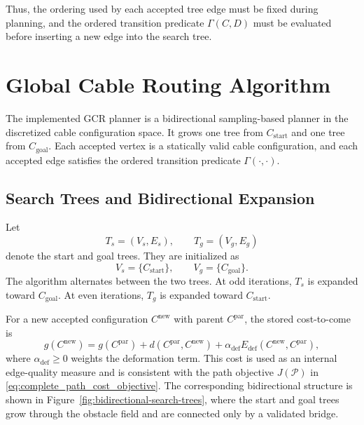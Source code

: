 \documentclass{pas}
\begin{document}
Thus, the ordering used by each accepted tree edge must be fixed
during planning, and the ordered transition predicate $\Gamma(C,D)$
must be evaluated before inserting a new edge into the search tree.



\section{Global Cable Routing Algorithm}
\label{sec:gcr_algorithm}

The implemented GCR planner is a bidirectional sampling-based planner in the discretized cable configuration space. It grows one tree from \(C_{\mathrm{start}}\) and one tree from \(C_{\mathrm{goal}}\). Each accepted vertex is a statically valid cable configuration, and each accepted edge satisfies the ordered transition predicate \(\Gamma(\cdot,\cdot)\).

\subsection{Search Trees and Bidirectional Expansion}
\label{subsec:gcr_search_trees}

Let
\begin{equation}
T_s=(V_s,E_s),
\qquad
T_g=(V_g,E_g)
\label{eq:gcr_two_trees}
\end{equation}
denote the start and goal trees. They are initialized as
\begin{equation}
V_s=\{C_{\mathrm{start}}\},
\qquad
V_g=\{C_{\mathrm{goal}}\}.
\label{eq:gcr_tree_initialization}
\end{equation}
The algorithm alternates between the two trees. At odd iterations, \(T_s\) is expanded toward \(C_{\mathrm{goal}}\). At even iterations, \(T_g\) is expanded toward \(C_{\mathrm{start}}\).

For a new accepted configuration \(C^{\mathrm{new}}\) with parent \(C^{\mathrm{par}}\), the stored cost-to-come is
\begin{equation}
g(C^{\mathrm{new}})
=
g(C^{\mathrm{par}})
+
d(C^{\mathrm{par}},C^{\mathrm{new}})
+
\alpha_{\mathrm{def}}
E_{\mathrm{def}}(C^{\mathrm{new}},C^{\mathrm{par}}),
\label{eq:tree_cost_to_come}
\end{equation}
where \(\alpha_{\mathrm{def}}\geq0\) weights the deformation term. This cost is used as an internal edge-quality measure and is consistent with the path objective \(J(\mathcal{P})\) in \eqref{eq:complete_path_cost_objective}.
The corresponding bidirectional structure is shown in
Figure~\ref{fig:bidirectional-search-trees}, where the start and goal trees grow
through the obstacle field and are connected only by a validated bridge.
\end{document}
